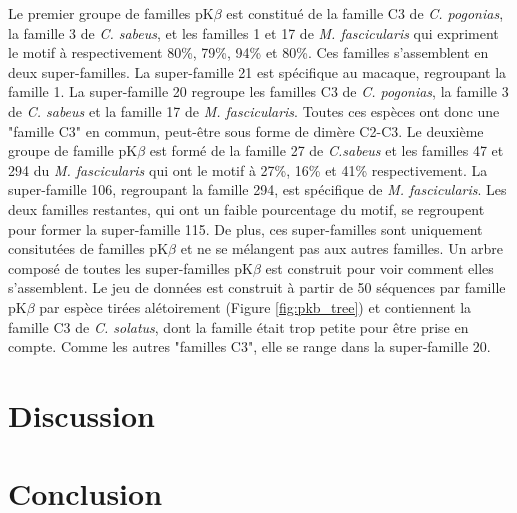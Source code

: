 \documentclass[12pt,a4paper]{article}
\begin{document}
	Le premier groupe de familles pK$\beta$ est constitué de la famille C3 de \textit{C. pogonias}, la famille 3 de \textit{C. sabeus}, et les familles 1 et 17 de \textit{M. fascicularis} qui expriment le motif à respectivement 80\%, 79\%, 94\% et 80\%. Ces familles s'assemblent en deux super-familles. La super-famille 21 est spécifique au macaque, regroupant la famille 1. La super-famille 20 regroupe les familles C3 de \textit{C. pogonias}, la famille 3 de \textit{C. sabeus} et la famille 17 de \textit{M. fascicularis}. Toutes ces espèces ont donc une "famille C3" en commun, peut-être sous forme de dimère C2-C3. Le deuxième groupe de famille pK$\beta$ est formé de la famille 27 de  \textit{C.sabeus} et les familles  47 et 294 du \textit{M. fascicularis} qui ont le motif à 27\%, 16\% et 41\% respectivement. La super-famille 106, regroupant la famille 294, est spécifique de \textit{M. fascicularis}. Les deux familles restantes, qui ont un faible pourcentage du motif, se regroupent pour former la super-famille 115. De plus, ces super-familles sont uniquement consitutées de familles pK$\beta$ et ne se mélangent pas aux autres familles.
	Un arbre composé de toutes les super-familles pK$\beta$ est construit pour voir comment elles s'assemblent. Le jeu de données est construit à partir de 50 séquences par famille pK$\beta$ par espèce tirées alétoirement (Figure \ref{fig:pkb_tree}) et contiennent la famille C3 de \textit{C. solatus}, dont la famille était trop petite pour être prise en compte. Comme les autres "familles C3", elle se range dans la super-famille 20. 

\section{Discussion}
\section{Conclusion}

\newpage
\strut  ~  \mbox{}  \null
\newpage

  

%
% 
%
%
%
% 
% 
\end{document}
